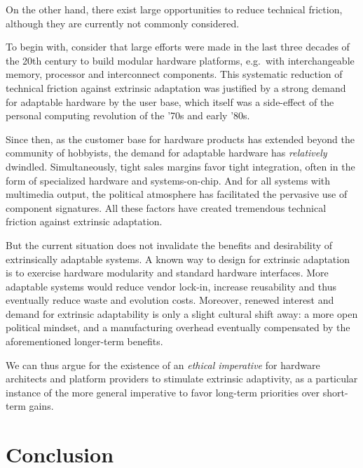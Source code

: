 \documentclass[a4paper]{article}
\newcommand{\eg}{e.g.~}
\begin{document}
On the other hand, there exist large opportunities to reduce technical
friction, although they are currently not commonly
considered.

To begin with, consider that large efforts were made in the last three
decades of the 20th century to build modular hardware platforms, \eg with
interchangeable memory, processor and interconnect components. This
systematic reduction of technical friction against extrinsic
adaptation was justified by a strong demand for adaptable hardware by
the user base, which itself was a side-effect of the personal
computing revolution of the '70s and early '80s.

Since then, as the customer base for hardware products has extended
beyond the community of hobbyists, the demand for adaptable hardware
has \emph{relatively} dwindled\footnotemark{}. Simultaneously, tight sales margins
favor tight integration, often in the form of specialized hardware and
systems-on-chip. And for all systems with multimedia output, the
political atmosphere has facilitated the pervasive use of component
signatures. All these factors have created tremendous technical
friction against extrinsic adaptation.


But the current situation does not invalidate the benefits and
desirability of extrinsically adaptable systems. A known way to design
for extrinsic adaptation is to exercise hardware modularity and
standard hardware interfaces. More adaptable systems would
reduce vendor lock-in, increase reusability and thus eventually reduce
waste and evolution costs. Moreover, renewed interest and demand for
extrinsic adaptability is only a slight cultural shift away: a more
open political mindset, and a manufacturing overhead eventually
compensated by the aforementioned longer-term benefits.

We can thus argue for the existence of an \emph{ethical imperative}
for hardware architects and platform providers to stimulate extrinsic
adaptivity, as a particular instance of the more general imperative to
favor long-term priorities over short-term gains.

\section{Conclusion}\label{sec:conc}
\end{document}
